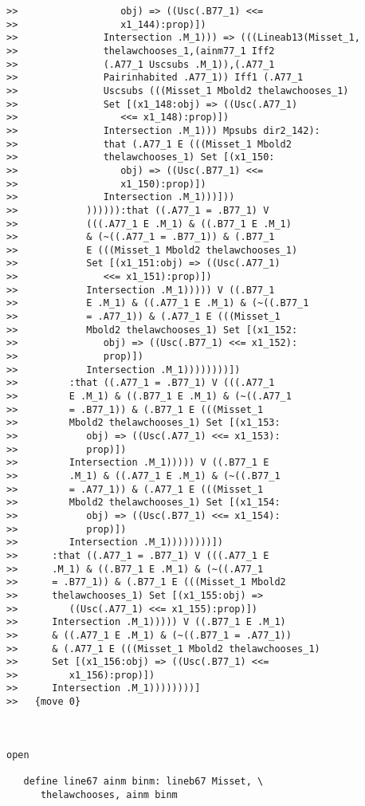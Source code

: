 \documentclass[12pt]{article}
\begin{document}
\begin{verbatim}
>>                  obj) => ((Usc(.B77_1) <<=
>>                  x1_144):prop)])
>>               Intersection .M_1))) => (((Lineab13(Misset_1,
>>               thelawchooses_1,(ainm77_1 Iff2
>>               (.A77_1 Uscsubs .M_1)),(.A77_1
>>               Pairinhabited .A77_1)) Iff1 (.A77_1
>>               Uscsubs (((Misset_1 Mbold2 thelawchooses_1)
>>               Set [(x1_148:obj) => ((Usc(.A77_1)
>>                  <<= x1_148):prop)])
>>               Intersection .M_1))) Mpsubs dir2_142):
>>               that (.A77_1 E (((Misset_1 Mbold2
>>               thelawchooses_1) Set [(x1_150:
>>                  obj) => ((Usc(.B77_1) <<=
>>                  x1_150):prop)])
>>               Intersection .M_1)))]))
>>            )))))):that ((.A77_1 = .B77_1) V
>>            (((.A77_1 E .M_1) & ((.B77_1 E .M_1)
>>            & (~((.A77_1 = .B77_1)) & (.B77_1
>>            E (((Misset_1 Mbold2 thelawchooses_1)
>>            Set [(x1_151:obj) => ((Usc(.A77_1)
>>               <<= x1_151):prop)])
>>            Intersection .M_1))))) V ((.B77_1
>>            E .M_1) & ((.A77_1 E .M_1) & (~((.B77_1
>>            = .A77_1)) & (.A77_1 E (((Misset_1
>>            Mbold2 thelawchooses_1) Set [(x1_152:
>>               obj) => ((Usc(.B77_1) <<= x1_152):
>>               prop)])
>>            Intersection .M_1))))))))])
>>         :that ((.A77_1 = .B77_1) V (((.A77_1
>>         E .M_1) & ((.B77_1 E .M_1) & (~((.A77_1
>>         = .B77_1)) & (.B77_1 E (((Misset_1
>>         Mbold2 thelawchooses_1) Set [(x1_153:
>>            obj) => ((Usc(.A77_1) <<= x1_153):
>>            prop)])
>>         Intersection .M_1))))) V ((.B77_1 E
>>         .M_1) & ((.A77_1 E .M_1) & (~((.B77_1
>>         = .A77_1)) & (.A77_1 E (((Misset_1
>>         Mbold2 thelawchooses_1) Set [(x1_154:
>>            obj) => ((Usc(.B77_1) <<= x1_154):
>>            prop)])
>>         Intersection .M_1))))))))])
>>      :that ((.A77_1 = .B77_1) V (((.A77_1 E
>>      .M_1) & ((.B77_1 E .M_1) & (~((.A77_1
>>      = .B77_1)) & (.B77_1 E (((Misset_1 Mbold2
>>      thelawchooses_1) Set [(x1_155:obj) =>
>>         ((Usc(.A77_1) <<= x1_155):prop)])
>>      Intersection .M_1))))) V ((.B77_1 E .M_1)
>>      & ((.A77_1 E .M_1) & (~((.B77_1 = .A77_1))
>>      & (.A77_1 E (((Misset_1 Mbold2 thelawchooses_1)
>>      Set [(x1_156:obj) => ((Usc(.B77_1) <<=
>>         x1_156):prop)])
>>      Intersection .M_1))))))))]
>>   {move 0}



open

   define line67 ainm binm: lineb67 Misset, \
      thelawchooses, ainm binm


\end{verbatim}
\end{document}
